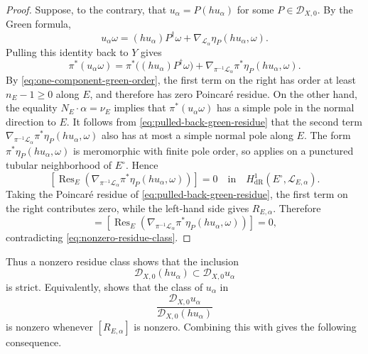 \documentclass[12pt]{amsart}
\numberwithin{equation}{section}
\theoremstyle{plain}
\theoremstyle{definition}
\theoremstyle{remark}
\theoremstyle{definition}
\DeclareMathOperator{\Res}{Res}
\newcommand{\D}{\mathscr D}
\newcommand{\Lcal}{\mathscr L}
\begin{document}
\begin{proof}
Suppose, to the contrary, that $u_\alpha=P(hu_\alpha)$ for some $P\in\D_{X,0}$. By the Green formula,
\begin{equation*}
u_\alpha\omega=(hu_\alpha)P^\dagger\omega+\nabla_{\Lcal_\alpha}\eta_P(hu_\alpha,\omega).
\end{equation*}
Pulling this identity back to $Y$ gives
\begin{equation}\label{eq:pulled-back-green-residue}
\pi^*(u_\alpha\omega)=\pi^*\bigl((hu_\alpha)P^\dagger\omega\bigr)+\nabla_{\pi^{-1}\Lcal_\alpha}\pi^*\eta_P(hu_\alpha,\omega).
\end{equation}
By \eqref{eq:one-component-green-order}, the first term on the right has order at least $n_E-1\geq0$ along $E$, and therefore has zero Poincar\'e residue. On the other hand, the equality $N_E\cdot\alpha=\nu_E$ implies that $\pi^*(u_\alpha\omega)$ has a simple pole in the normal direction to $E$. It follows from \eqref{eq:pulled-back-green-residue} that the second term $\nabla_{\pi^{-1}\Lcal_\alpha}\pi^*\eta_P(hu_\alpha,\omega)$ also has at most a simple normal pole along $E$. The form $\pi^*\eta_P(hu_\alpha,\omega)$ is meromorphic with finite pole order, so  applies on a punctured tubular neighborhood of $E^\circ$. Hence
\begin{equation*}
\left[\Res_E\left(\nabla_{\pi^{-1}\Lcal_\alpha}\pi^*\eta_P(hu_\alpha,\omega)\right)\right]=0\quad\text{in}\quad H^1_{\mathrm{dR}}(E^\circ,\Lcal_{E,\alpha}).
\end{equation*}
Taking the Poincar\'e residue of \eqref{eq:pulled-back-green-residue}, the first term on the right contributes zero, while the left-hand side gives $R_{E,\alpha}$. Therefore
\begin{equation*}
[R_{E,\alpha}]=\left[\Res_E\left(\nabla_{\pi^{-1}\Lcal_\alpha}\pi^*\eta_P(hu_\alpha,\omega)\right)\right]=0,
\end{equation*}
contradicting \eqref{eq:nonzero-residue-class}.
\end{proof}

Thus a nonzero residue class shows that the inclusion
\begin{equation*}
\D_{X,0}(hu_\alpha)\subset\D_{X,0}u_\alpha
\end{equation*}
is strict. Equivalently,  shows that the class of $u_\alpha$ in
\begin{equation*}
\frac{\D_{X,0}u_\alpha}{\D_{X,0}(hu_\alpha)}
\end{equation*}
is nonzero whenever $[R_{E,\alpha}]$ is nonzero. Combining this with  gives the following consequence.
\end{document}
